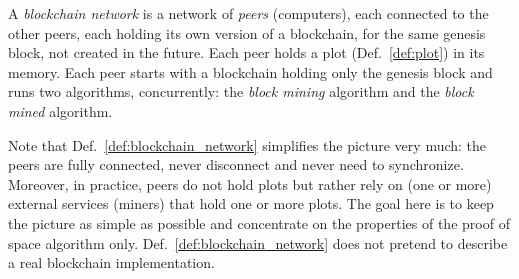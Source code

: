 \begin{definition}\label{def:blockchain_network}
  A \emph{blockchain network} is a
  network of \emph{peers} (computers), each connected to the other peers,
  each holding its own version of a blockchain, for the same genesis block,
  not created in the future.
  Each peer holds a plot (Def.~\ref{def:plot}) in its memory.
  Each peer starts with a blockchain holding only the genesis block and runs two
  algorithms, concurrently: the \emph{block mining} algorithm
  and the \emph{block mined} algorithm.
\end{definition}
%
Note that Def.~\ref{def:blockchain_network} simplifies the picture very much:
the peers are fully connected, never disconnect and never need to synchronize.
Moreover, in practice, peers do not hold plots but rather rely on (one or more)
external services (miners) that hold one or more plots.
The goal here is to keep the picture as simple as possible and concentrate on the properties of the
proof of space algorithm only. Def.~\ref{def:blockchain_network} does not pretend
to describe a real blockchain implementation.

